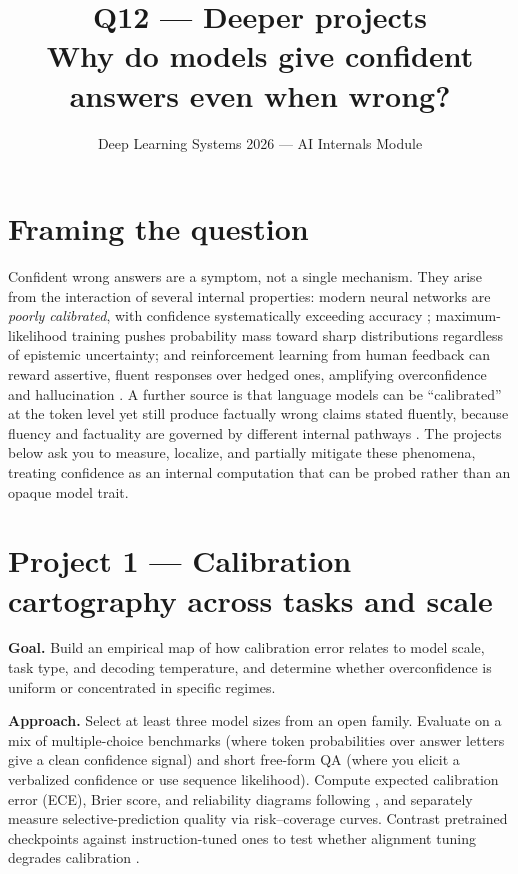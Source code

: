 \documentclass[11pt]{article}
\title{Q12 --- Deeper projects\\\large Why do models give confident answers even when wrong?}
\author{Deep Learning Systems 2026 --- AI Internals Module}
\date{}
\begin{document}
\maketitle

\section*{Framing the question}

Confident wrong answers are a symptom, not a single mechanism. They arise from
the interaction of several internal properties: modern neural networks are
\emph{poorly calibrated}, with confidence systematically exceeding accuracy
\citep{guo2017calibration}; maximum-likelihood training pushes probability mass
toward sharp distributions regardless of epistemic uncertainty; and
reinforcement learning from human feedback can reward assertive, fluent
responses over hedged ones, amplifying overconfidence and hallucination
\citep{ouyang2022training,ji2023survey}. A further source is that language
models can be ``calibrated'' at the token level yet still produce factually
wrong claims stated fluently, because fluency and factuality are governed by
different internal pathways \citep{kadavath2022know}. The projects below ask you
to measure, localize, and partially mitigate these phenomena, treating
confidence as an internal computation that can be probed rather than an opaque
model trait.

\section*{Project 1 --- Calibration cartography across tasks and scale}

\textbf{Goal.} Build an empirical map of how calibration error relates to model
scale, task type, and decoding temperature, and determine whether
overconfidence is uniform or concentrated in specific regimes.

\textbf{Approach.} Select at least three model sizes from an open family.
Evaluate on a mix of multiple-choice benchmarks (where token probabilities over
answer letters give a clean confidence signal) and short free-form QA (where you
elicit a verbalized confidence or use sequence likelihood). Compute expected
calibration error (ECE), Brier score, and reliability diagrams following
\citet{guo2017calibration}, and separately measure selective-prediction quality
via risk--coverage curves. Contrast pretrained checkpoints against
instruction-tuned ones to test whether alignment tuning degrades calibration
\citep{kadavath2022know,ouyang2022training}.
\end{document}
